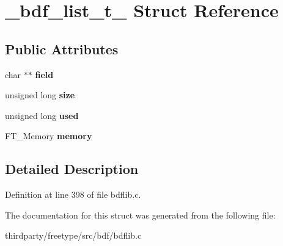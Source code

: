 \hypertarget{struct__bdf__list__t__}{}\section{\+\_\+bdf\+\_\+list\+\_\+t\+\_\+ Struct Reference}
\label{struct__bdf__list__t__}
\subsection*{Public Attributes}
\begin{DoxyCompactItemize}
\item 
\mbox{\label{struct__bdf__list__t___a5a604279ddb1852424e2b36e547636e1}} 
char $\ast$$\ast$ {\bfseries field}
\item 
\mbox{\label{struct__bdf__list__t___af735d1b36a5058fba9814c3f1ffa0665}} 
unsigned long {\bfseries size}
\item 
\mbox{\label{struct__bdf__list__t___a4ef35c698acda6adcaee729cf090789c}} 
unsigned long {\bfseries used}
\item 
\mbox{\label{struct__bdf__list__t___a44aed614137151f94e2def0a70731416}} 
F\+T\+\_\+\+Memory {\bfseries memory}
\end{DoxyCompactItemize}


\subsection{Detailed Description}


Definition at line 398 of file bdflib.\+c.



The documentation for this struct was generated from the following file\+:\begin{DoxyCompactItemize}
\item 
thirdparty/freetype/src/bdf/bdflib.\+c\end{DoxyCompactItemize}
